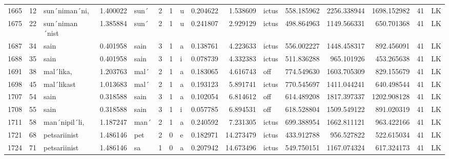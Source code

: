 \begin{tabular}{lrlrllllrrlrrrll}
1665 &          12 &    sun´niman´ni, &  1.400022 &    sun´ &        2 &      1 &       u &      0.204622 &      1.538609 &  ictus &   558.185962 &  2256.338944 &  1698.152982 &     41 &        LK \\
1675 &          22 &   sun´niman´nist &  1.385884 &    sun´ &        2 &      1 &       u &      0.241807 &      2.929129 &  ictus &   498.864963 &  1149.566331 &   650.701368 &     41 &        LK \\
1687 &          34 &             sain &  0.401958 &    sain &        3 &      1 &       a &      0.138761 &      4.223633 &  ictus &   556.002227 &  1448.458317 &   892.456091 &     41 &        LK \\
1688 &          35 &             sain &  0.401958 &    sain &        3 &      1 &       i &      0.078739 &      4.332383 &  ictus &   511.836288 &   965.101926 &   453.265638 &     41 &        LK \\
1691 &          38 &        mal´lika, &  1.203763 &    mal´ &        2 &      1 &       a &      0.183065 &      4.616743 &    off &   774.549630 &  1603.705309 &   829.155679 &     41 &        LK \\
1698 &          45 &       mal´likast &  1.013683 &    mal´ &        2 &      1 &       a &      0.193123 &      5.891741 &  ictus &   770.545697 &  1411.044241 &   640.498544 &     41 &        LK \\
1707 &          54 &             sain &  0.318588 &    sain &        3 &      1 &       a &      0.102054 &      6.814612 &    off &   614.489208 &  1817.397337 &  1202.908128 &     41 &        LK \\
1708 &          55 &             sain &  0.318588 &    sain &        3 &      1 &       i &      0.057785 &      6.894531 &    off &   618.528804 &  1509.549122 &   891.020319 &     41 &        LK \\
1711 &          58 &    man´nipil´li, &  1.187247 &    man´ &        2 &      1 &       a &      0.240592 &      7.231305 &  ictus &   699.388954 &  1662.811121 &   963.422166 &     41 &        LK \\
1721 &          68 &     petsariinist &  1.486146 &     pet &        2 &      0 &       e &      0.182971 &     14.273479 &  ictus &   433.912788 &   956.527822 &   522.615034 &     41 &        LK \\
1724 &          71 &     petsariinist &  1.486146 &      sa &        1 &      0 &       a &      0.207942 &     14.673496 &  ictus &   549.750151 &  1167.074324 &   617.324173 &     41 &        LK \\

\end{tabular}
